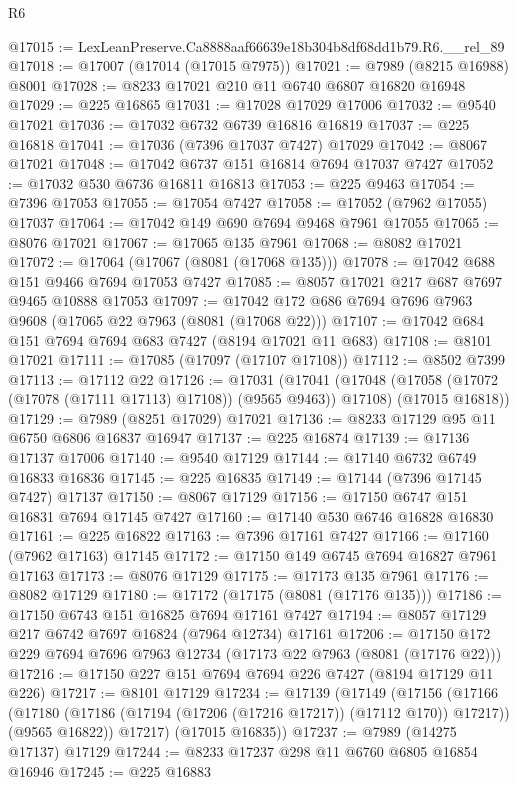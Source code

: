 \begin{lexlean}{R6}
\begin{coremodule}
@17015 := LexLeanPreserve.Ca8888aaf66639e18b304b8df68dd1b79.R6.__rel_89
@17018 := @17007 (@17014 (@17015 @7975))
@17021 := @7989 (@8215 @16988) @8001
@17028 := @8233 @17021 @210 @11 @6740 @6807 @16820 @16948
@17029 := @225 @16865
@17031 := @17028 @17029 @17006
@17032 := @9540 @17021
@17036 := @17032 @6732 @6739 @16816 @16819
@17037 := @225 @16818
@17041 := @17036 (@7396 @17037 @7427) @17029
@17042 := @8067 @17021
@17048 := @17042 @6737 @151 @16814 @7694 @17037 @7427
@17052 := @17032 @530 @6736 @16811 @16813
@17053 := @225 @9463
@17054 := @7396 @17053
@17055 := @17054 @7427
@17058 := @17052 (@7962 @17055) @17037
@17064 := @17042 @149 @690 @7694 @9468 @7961 @17055
@17065 := @8076 @17021
@17067 := @17065 @135 @7961
@17068 := @8082 @17021
@17072 := @17064 (@17067 (@8081 (@17068 @135)))
@17078 := @17042 @688 @151 @9466 @7694 @17053 @7427
@17085 := @8057 @17021 @217 @687 @7697 @9465 @10888 @17053
@17097 := @17042 @172 @686 @7694 @7696 @7963 @9608 (@17065 @22 @7963 (@8081 (@17068 @22)))
@17107 := @17042 @684 @151 @7694 @7694 @683 @7427 (@8194 @17021 @11 @683)
@17108 := @8101 @17021
@17111 := @17085 (@17097 (@17107 @17108))
@17112 := @8502 @7399
@17113 := @17112 @22
@17126 := @17031
    (@17041
      (@17048 (@17058 (@17072 (@17078 (@17111 @17113) @17108)) (@9565 @9463)) @17108)
      (@17015 @16818))
@17129 := @7989 (@8251 @17029) @17021
@17136 := @8233 @17129 @95 @11 @6750 @6806 @16837 @16947
@17137 := @225 @16874
@17139 := @17136 @17137 @17006
@17140 := @9540 @17129
@17144 := @17140 @6732 @6749 @16833 @16836
@17145 := @225 @16835
@17149 := @17144 (@7396 @17145 @7427) @17137
@17150 := @8067 @17129
@17156 := @17150 @6747 @151 @16831 @7694 @17145 @7427
@17160 := @17140 @530 @6746 @16828 @16830
@17161 := @225 @16822
@17163 := @7396 @17161 @7427
@17166 := @17160 (@7962 @17163) @17145
@17172 := @17150 @149 @6745 @7694 @16827 @7961 @17163
@17173 := @8076 @17129
@17175 := @17173 @135 @7961
@17176 := @8082 @17129
@17180 := @17172 (@17175 (@8081 (@17176 @135)))
@17186 := @17150 @6743 @151 @16825 @7694 @17161 @7427
@17194 := @8057 @17129 @217 @6742 @7697 @16824 (@7964 @12734) @17161
@17206 := @17150 @172 @229 @7694 @7696 @7963 @12734 (@17173 @22 @7963 (@8081 (@17176 @22)))
@17216 := @17150 @227 @151 @7694 @7694 @226 @7427 (@8194 @17129 @11 @226)
@17217 := @8101 @17129
@17234 := @17139
    (@17149
      (@17156
        (@17166
          (@17180 (@17186 (@17194 (@17206 (@17216 @17217)) (@17112 @170)) @17217))
          (@9565 @16822))
        @17217)
      (@17015 @16835))
@17237 := @7989 (@14275 @17137) @17129
@17244 := @8233 @17237 @298 @11 @6760 @6805 @16854 @16946
@17245 := @225 @16883

\end{coremodule}
\end{lexlean}
